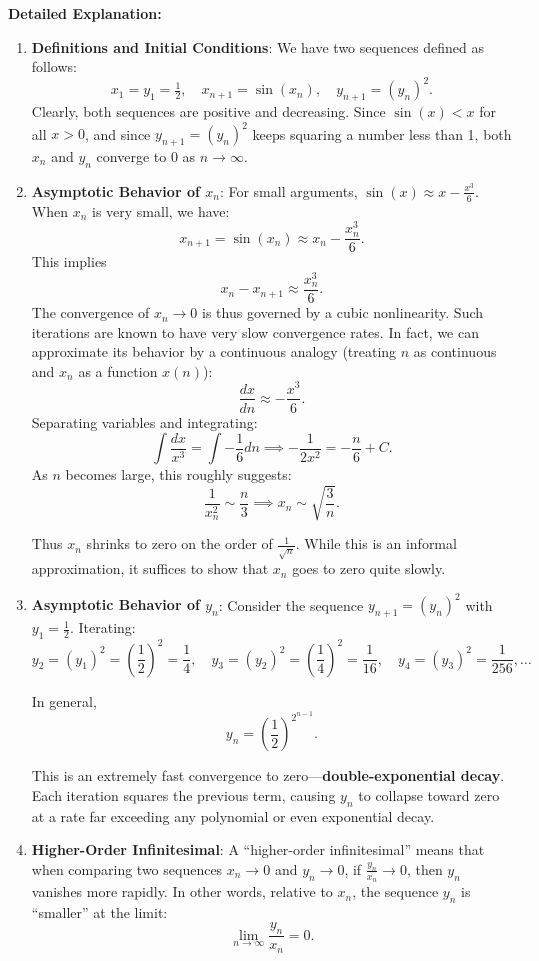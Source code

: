 \documentclass[a4paper,12pt]{article}
\begin{document}
\textbf{Detailed Explanation:}
\begin{enumerate}
\item 
\textbf{Definitions and Initial Conditions}:\newline
We have two sequences defined as follows:
\[
x_1 = y_1 = \tfrac{1}{2}, \quad x_{n+1} = \sin(x_n), \quad y_{n+1} = (y_n)^2.
\]
Clearly, both sequences are positive and decreasing. Since \(\sin(x) < x\) for all \(x > 0\), and since \(y_{n+1} = (y_n)^2\) keeps squaring a number less than 1, both \(x_n\) and \(y_n\) converge to 0 as \(n \to \infty\).

\item 
\textbf{Asymptotic Behavior of \(x_n\)}:\newline
For small arguments, \(\sin(x) \approx x - \frac{x^3}{6}\). When \(x_n\) is very small, we have:
\[
x_{n+1} = \sin(x_n) \approx x_n - \frac{x_n^3}{6}.
\]
This implies
\[
x_n - x_{n+1} \approx \frac{x_n^3}{6}.
\]
The convergence of \(x_n \to 0\) is thus governed by a cubic nonlinearity. Such iterations are known to have very slow convergence rates. In fact, we can approximate its behavior by a continuous analogy (treating \(n\) as continuous and \(x_n\) as a function \(x(n)\)):
\[
\frac{dx}{dn} \approx -\frac{x^3}{6}.
\]
Separating variables and integrating:
\[
\int \frac{dx}{x^3} = \int -\frac{1}{6} dn \implies -\frac{1}{2x^2} = -\frac{n}{6} + C.
\]
As \(n\) becomes large, this roughly suggests:
\[
\frac{1}{x_n^2} \sim \frac{n}{3} \implies x_n \sim \sqrt{\frac{3}{n}}.
\]

Thus \(x_n\) shrinks to zero on the order of \(\frac{1}{\sqrt{n}}\). While this is an informal approximation, it suffices to show that \(x_n\) goes to zero quite slowly.

\item 
\textbf{Asymptotic Behavior of \(y_n\)}:\newline
Consider the sequence \(y_{n+1} = (y_n)^2\) with \(y_1=\tfrac{1}{2}\). Iterating:
\[
y_2 = (y_1)^2 = \left(\frac{1}{2}\right)^2 = \frac{1}{4}, \quad
y_3 = (y_2)^2 = \left(\frac{1}{4}\right)^2 = \frac{1}{16}, \quad
y_4 = (y_3)^2 = \frac{1}{256}, \ldots
\]

In general,
\[
y_n = \left(\frac{1}{2}\right)^{2^{n-1}}.
\]

This is an extremely fast convergence to zero—\textbf{double-exponential decay}. Each iteration squares the previous term, causing \(y_n\) to collapse toward zero at a rate far exceeding any polynomial or even exponential decay.

\item 
\textbf{Higher-Order Infinitesimal}:\newline
A “higher-order infinitesimal” means that when comparing two sequences \(x_n \to 0\) and \(y_n \to 0\), if \(\frac{y_n}{x_n} \to 0\), then \(y_n\) vanishes more rapidly. In other words, relative to \(x_n\), the sequence \(y_n\) is “smaller” at the limit:
\[
\lim_{n \to \infty} \frac{y_n}{x_n} = 0.
\]


\end{enumerate}
\end{document}
